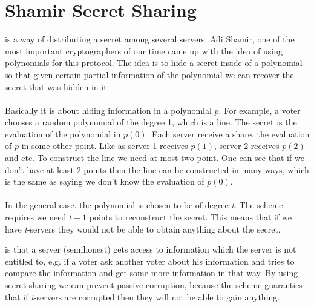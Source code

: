 \section{Shamir Secret Sharing}
 is a way of distributing a secret among several servers. Adi Shamir, one of the most important cryptographers of our time came up with the idea of using polynomials for this protocol. The idea is to hide a secret inside of a polynomial so that given certain partial information of the polynomial we can recover the secret that was hidden in it.\\ \\
Basically it is about hiding information in a polynomial \begin{math}p\end{math}. For example, a voter chooses a random polynomial of the degree 1, which is a line. The secret is the evaluation of the polynomial in \begin{math}p(0)\end{math}. Each server receive a share, the evaluation of  \begin{math}p\end{math} in some other point. Like as server  1 receives  \begin{math}p(1)\end{math}, server 2 receives \begin{math}p(2)\end{math} and etc. To construct the line we need at most two point. One can see that if we don’t have at least 2 points then the line can be constructed in many ways, which is the same as saying we don’t know the evaluation of \begin{math}p(0)\end{math}.\\ \\
In the general case, the polynomial is chosen to be of degree \textit{t}. The scheme requires we need 
 \begin{math}t+1\end{math} points to reconstruct the secret. This means that if we have \textit{t}-servers they would not be able to obtain anything about the secret. 

 is that a server (semihonest) gets access to information which the server is not entitled to, e.g. if a voter ask another voter about his information and tries to compare the information and get some more information in that way. By using secret sharing we can prevent passive corruption, because the scheme guaranties that if \textit{t}-servers are corrupted then they will not be able to gain anything.


